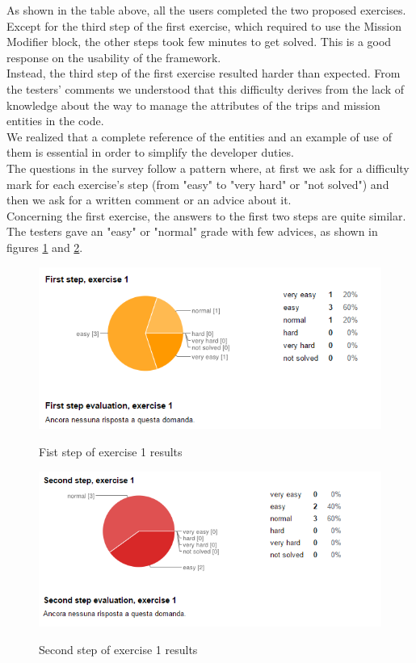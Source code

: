 As shown in the table above, all the users completed the two proposed exercises.
Except for the third step of the first exercise, which required to use the Mission Modifier block, the other steps took few minutes to get solved.
This is a good response on the usability of the framework.
\\
Instead, the third step of the first exercise resulted harder than expected. 
From the testers' comments we understood that this difficulty derives from the lack of knowledge about the way to manage the attributes of the trips and mission entities in the code.
\\
We realized that a complete reference of the entities and an example of use of them is essential in order to simplify the developer duties.
\\

The questions in the survey follow a pattern where, at first we ask for a difficulty mark for each exercise's step (from "easy" to "very hard" or "not solved") and then we ask for a written comment or an advice about it.
\\
Concerning the first exercise,  the answers to the first two steps are quite similar.
The testers gave an "easy" or "normal" grade with few advices, as shown in figures \ref{fig:survey2} and \ref{fig:survey3}.
\\

 \begin{figure}[h!]
   \centering
   \includegraphics[width=\linewidth]{pictures/survey2.png}
   \label{fig:survey2}
   \caption{Fist step of exercise 1 results}
 \end{figure}

 \begin{figure}[h!]
   \centering
   \includegraphics[width=\linewidth]{pictures/survey3.png}
   \label{fig:survey3}
   \caption{Second step of exercise 1 results}
 \end{figure}

